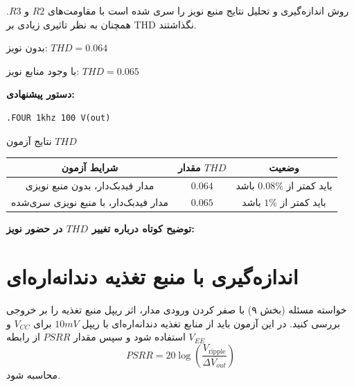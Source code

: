 \documentclass[12pt,a4paper]{article}
\begin{document}
\begin{calcbox}{روش اندازه‌گیری و تحلیل نتایج}
منبع نویز را سری شده است با مقاومت‌های $R2$ و $R3$. همچنان به نظر تاثیری زیادی بر THD نگذاشتند.


بدون نویز: $THD = 0.064$

با وجود منابع نویز: $THD = 0.065$

\textbf{دستور پیشنهادی:}
\begin{latin}
\begin{lstlisting}[language={}]
.FOUR 1khz 100 V(out)
\end{lstlisting}
\end{latin}

\vspace{4cm}
\end{calcbox}

\begin{answerbox}{نتایج آزمون $THD$}
\begin{center}
\begin{tabular}{|c|c|c|}
\hline
\textbf{شرایط آزمون} & \textbf{مقدار $THD$} & \textbf{وضعیت} \\
\hline
مدار فیدبک‌دار، بدون منبع نویزی & $0.064$ & باید کمتر از $0.08\%$ باشد \\
\hline
مدار فیدبک‌دار، با منبع نویزی سری‌شده & $0.065$& باید کمتر از $1\%$ باشد \\
\hline
\end{tabular}
\end{center}


\vspace{1cm}

\textbf{توضیح کوتاه درباره تغییر $THD$ در حضور نویز:}

\vspace{4cm}
\end{answerbox}

\newpage

\section{اندازه‌گیری  با منبع تغذیه دندانه‌اره‌ای}

\begin{taskbox}{خواسته مسئله (بخش ۹)}
با صفر کردن ورودی مدار، اثر ریپل منبع تغذیه را بر خروجی بررسی کنید. در این آزمون باید از منابع تغذیه دندانه‌اره‌ای با ریپل $10mV$ برای $V_{CC}$ و $V_{EE}$ استفاده شود و سپس مقدار $PSRR$ از رابطه
$$
PSRR = 20\log\left(\frac{V_{\text{ripple}}}{\Delta V_{out}}\right)
$$
محاسبه شود.
\end{taskbox}
\end{document}
